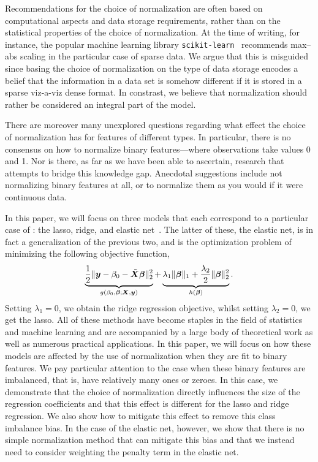 Recommendations for the choice of normalization are often based on computational aspects
and data storage requirements, rather than on the statistical properties of the choice of
normalization. At the time of writing, for instance, the popular machine learning library
\texttt{scikit-learn}~\citep{scikit-learndevelopers2024} recommends max--abs scaling in the
particular case of sparse data. We argue that this is misguided since basing the choice of
normalization on the type of data storage encodes a belief that the information in a data
set is somehow different if it is stored in a sparse viz-a-viz dense format. In constrast,
we believe that normalization should rather be considered an integral part of the model.

There are moreover many unexplored questions regarding what effect the choice of
normalization has for features of different types. In particular, there is no consensus on
how to normalize binary features---where observations take values 0 and 1. Nor is there, as
far as we have been able to ascertain, research that attempts to bridge this knowledge gap.
Anecdotal suggestions include not normalizing binary features at all, or to normalize them
as you would if it were continuous data.

In this paper, we will focus on three models that each correspond to a particular case of
: the lasso, ridge, and elastic net~\citep{zou2005}. The latter
of these, the elastic net, is in fact a generalization of the previous two, and is the
optimization problem of minimizing the following objective function,
%
\begin{equation*}
  \underbrace{\frac{1}{2} \lVert \boldsymbol y - \beta_0 - \tilde{\boldsymbol{X}}\boldsymbol{\beta} \rVert^2_2}_{g(\beta_0, \boldsymbol{\beta}; \boldsymbol{X}, \boldsymbol{y})}  + \underbrace{\lambda_1 \lVert \boldsymbol\beta \rVert_1 + \frac{\lambda_2}{2}\lVert \boldsymbol \beta \rVert_2^2}_{h(\boldsymbol{\beta})}.
\end{equation*}
%
Setting \(\lambda_1 = 0\), we obtain the ridge regression objective, whilst setting
\(\lambda_2 = 0\), we get the lasso. All of these methods have become staples in the field
of statistics and machine learning and are accompanied by a large body of theoretical work
as well as numerous practical applications. In this paper, we will focus on how these
models are affected by the use of normalization when they are fit to binary features. We
pay particular attention to the case when these binary features are imbalanced, that is,
have relatively many ones or zeroes. In this case, we demonstrate that the choice of
normalization directly influences the size of the regression coefficients and that this
effect is different for the lasso and ridge regression. We also show how to mitigate this
effect to remove this class imbalance bias. In the case of the elastic net, however, we
show that there is no simple normalization method that can mitigate this bias and that we
instead need to consider weighting the penalty term in the elastic net.
